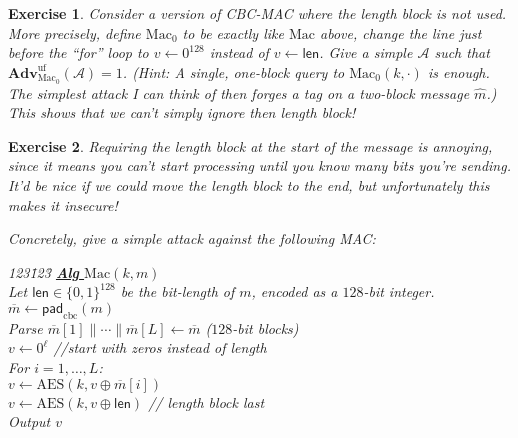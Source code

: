 \documentclass[11pt]{article}
\newtheorem{exercise}{Exercise}
\newcommand{\MAC}{\mathrm{Mac}}
\newcommand{\leng}{\mathsf{len}}
\newcommand{\calA}{\mathcal{A}}
\newcommand{\algorithm}[1]{\textbf{Alg} {#1}}
\newcommand{\Adv}{\mathbf{Adv}}
\newcommand{\bits}{\{0,1\}}
\newcommand{\hatm}{\hat{m}}
\newcommand{\barm}{\overline{m}}
\newcommand{\aes}{\mathrm{AES}}
\newcommand{\cbcmacpad}{\mathsf{pad}_{\mathrm{cbc}}}
\newcommand{\AdvUF}[2]{\Adv^{\mathrm{uf}}_{#1}({#2})}
\begin{document}
\begin{exercise} 

    Consider a version of CBC-MAC where the length block is not used.  More
    precisely, define $\MAC_0$ to be exactly like $\MAC$ above, change the line
    just before the ``for'' loop to $v\gets 0^{128}$ instead of $v\gets\leng$.
    Give a simple $\calA$ such that $\AdvUF{\MAC_0}{\calA}=1$.  (Hint: A single,
    one-block query to $\MAC_0(k,\cdot)$ is enough.  The simplest attack I can
    think of then forges a tag on a two-block message $\hatm$.)
    This shows that we can't simply ignore then length block!

\end{exercise}

\begin{exercise}
    Requiring the length block at the start of the message is annoying,
    since it means you can't start processing until you know many bits
    you're sending. It'd be nice if we could move the length block
    to the end, but unfortunately this makes it insecure!

    Concretely, give a simple attack against the following MAC:
    \begin{center}
        \begin{minipage}{2in}\begin{tabbing}
            123\=123\=\kill
            \underline{\algorithm{$\MAC(k,m)$}} \\[2pt]
            \> Let $\leng\in\bits^{128}$ be the bit-length of $m$, encoded
            as a $128$-bit integer.\\
            \> $\barm \gets \cbcmacpad(m)$\\
            \> Parse $\barm[1]\|\cdots\|\barm[L]\gets\barm$  \emph{($128$-bit
            blocks)}\\
            \> $v \gets 0^\ell$ //start with zeros instead of length\\
            \> For $i=1,\ldots,L$: \\
            \> \> $v \gets \aes(k,v\oplus\barm[i])$\\
            \> $v \gets \aes(k,v\oplus\leng)$ // length block last\\
            \> Output $v$
        \end{tabbing}\end{minipage}
    \end{center}
\end{exercise}
\end{document}
